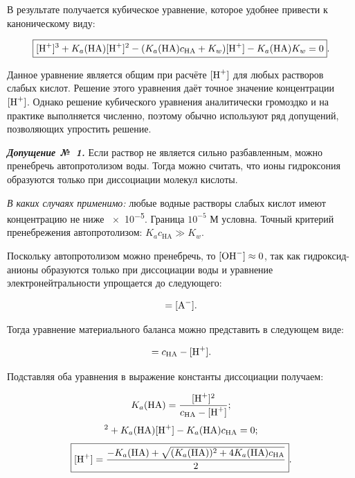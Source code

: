 В результате получается кубическое уравнение, которое удобнее привести к каноническому виду:

\begin{equation*}
    \boxed{[\ce{H^+}]^3 + K_a(\text{HA})[\ce{H^+}]^2 - (K_a(\text{HA})c_{\text{HA}} + K_w)[\ce{H^+}] - K_a(\text{HA})K_w = 0}.
\end{equation*}

Данное уравнение является общим при расчёте $[\ce{H^+}]$ для любых растворов слабых кислот. Решение этого уравнения даёт точное значение концентрации $[\ce{H^+}]$. Однако решение кубического уравнения аналитически громоздко и на практике выполняется численно, поэтому обычно используют ряд допущений, позволяющих упростить решение.

\textbf{\textit{Допущение №~1.}} Если раствор не является сильно разбавленным, можно пренебречь автопротолизом воды. Тогда можно считать, что ионы гидроксония образуются только при диссоциации молекул кислоты.

\textit{В каких случаях применимо:} любые водные растворы слабых кислот имеют концентрацию не ниже \qty{e-5}{\ruMolar}. Граница $10^{-5}$ М условна. Точный критерий пренебрежения автопротолизом: $K_a c_{\text{HA}} \gg K_w$.

Поскольку автопротолизом можно пренебречь, то $[\ce{OH^-}] \approx 0$, так как гид\-ро\-ксид-анионы образуются только при диссоциации воды и уравнение электронейтральности упрощается до следующего:

\begin{equation*}
    [\ce{H^+}] = [\ce{A^-}].
\end{equation*}

Тогда уравнение материального баланса можно представить в следующем виде:

\begin{equation*}
    [\ce{HA}] = c_{\text{HA}} - [\ce{H^+}].
\end{equation*}

Подставляя оба уравнения в выражение константы диссоциации получаем:

\begin{equation*}
    K_a(\text{HA})
    = \frac{[\ce{H^+}]^2}{c_{\text{HA}} - [\ce{H^+}]};
\end{equation*}
\begin{equation*}
    [\ce{H^+}]^2 + K_a(\text{HA})[\ce{H^+}] - K_a(\text{HA})c_{\text{HA}} = 0;
\end{equation*}
\begin{equation*}
    \boxed{[\ce{H^+}] = \frac{-K_a(\text{HA}) + \sqrt{(K_a(\text{HA}))^2 + 4K_a(\text{HA})c_{\text{HA}}}}{2}}.
\end{equation*}

